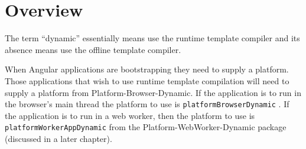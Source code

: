 \section{Overview}

The term “dynamic” essentially means use the runtime template compiler and its
absence means use the offline template compiler.

When Angular applications are bootstrapping they need to supply a platform. Those
applications that wish to use runtime template compilation will need to supply a
platform from Platform-Browser-Dynamic. If the application is to run in the browser’s
main thread the platform to use is
\texttt{platformBrowserDynamic}
. If the application is to
run in a web worker, then the platform to use is
\texttt{platformWorkerAppDynamic}
from the
Platform-WebWorker-Dynamic package (discussed in a later chapter).
